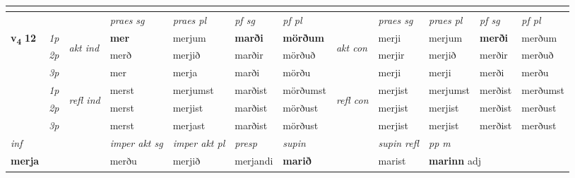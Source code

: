 \begin{longtable}[l]{X>{\footnotesize\itshape}llXXXXlXXXX}
\midrule
   & \\
   \midrule
 & &   & \textit{praes sg}  & \textit{praes pl}    & \textit{ pf sg} & \textit{pf pl} & & \textit{praes sg}  & \textit{praes pl}    & \textit{pf sg} & \textit{pf pl }  \\ \cmidrule{4-7} \cmidrule{9-12}
 \multirow{2}{*}{{{\textbf{v{\textsubscript{4}}} \Large{\textbf{12}}}}}  & 1p & \multirow{3}{*}{\begin{turn}{90}\textit{akt ind}\end{turn}} & \textbf{mer} & merjum & \textbf{marði} & \textbf{mörðum} & \multirow{3}{*}{\begin{turn}{90}\textit{akt con}\end{turn}} &merji & merjum & \textbf{merði} & merðum\\*
 & 2p &  &  merð  & merjið & marðir & mörðuð & & merjir & merjið & merðir & merðuð \\*
 & 3p &  & mer & merja & marði & mörðu & & merji & merji& merði & merðu \\*
\cmidrule{4-7} \cmidrule{9-12}
 & 1p & \multirow{3}{*}{\begin{turn}{90}\textit{refl ind}\end{turn}}  & merst & merjumst & marðist & mörðumst & \multirow{3}{*}{\begin{turn}{90}\textit{refl con}\end{turn}}  &merjist & merjumst & merðist & merðumst \\*
 & 2p &  & merst & merjist & marðist & mörðust & &merjist & merjist & merðist & merðust \\*
 & 3p  & & merst & merjast & marðist & mörðust & & merjist & merjist& merðist & merðust \\*
\cmidrule{4-7} \cmidrule{9-12}

   {\textit{inf}} & &  & \textit{imper akt sg} & \textit{imper akt pl}   & \textit{presp} & \textit{supin} && \textit{supin refl} & \textit{pp m} \\*
  {\textbf{merja}} & && merðu  & merjið   & merjandi &  \textbf{marið} && marist & \multicolumn{2}{l}{\textbf{marinn} adj\textbf{\textsubscript{}}} \\*

\midrule


\end{longtable}
